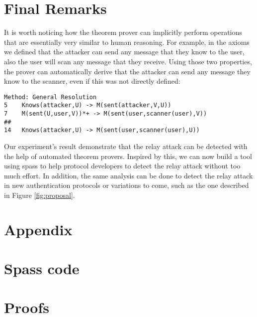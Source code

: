\documentclass{article}
\begin{document}
\section{Final Remarks}
	It is worth noticing how the theorem prover can implicitly perform operations
	that are essentially very similar to human reasoning. For example, in the 
	axioms we defined that the attacker can send any message that they know to the user,
	also the user will scan any message that they receive. Using those two properties,
	the prover can automatically derive that the attacker can send any message they know
	to the scanner, even if this was not directly defined:
\lstset{basicstyle=\ttfamily\footnotesize,breaklines=true}
\begin{lstlisting}[frame=single]
Method: General Resolution
5	 Knows(attacker,U) -> M(sent(attacker,V,U))
7	 M(sent(U,user,V))*+ -> M(sent(user,scanner(user),V))
##
14	 Knows(attacker,U) -> M(sent(user,scanner(user),U))
\end{lstlisting}

	Our experiment's result demonstrate that the relay attack can be detected
	with the help of automated theorem provers. 
	Inspired by this, we can now build a tool using spass to
	help protocol developers to detect the relay attack without too much
	effort. In addition, the same analysis can be done to detect the relay
	attack in new authentication protocols or variations to come, such as the
	one described in Figure \ref{fig:proposal}.

\section{Appendix}
\appendix

\section{Spass code}
\lstset{basicstyle=\ttfamily\footnotesize,breaklines=true}





\section{Proofs}






\end{document}
